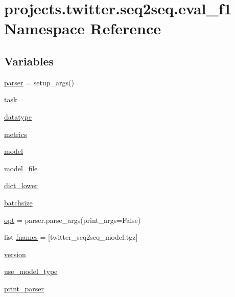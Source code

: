 \hypertarget{namespaceprojects_1_1twitter_1_1seq2seq_1_1eval__f1}{}\section{projects.\+twitter.\+seq2seq.\+eval\+\_\+f1 Namespace Reference}
\label{namespaceprojects_1_1twitter_1_1seq2seq_1_1eval__f1}
\subsection*{Variables}
\begin{DoxyCompactItemize}
\item 
\hyperlink{namespaceprojects_1_1twitter_1_1seq2seq_1_1eval__f1_ad558cbec4682c008ec6e7e47c9f2c86f}{parser} = setup\+\_\+args()
\item 
\hyperlink{namespaceprojects_1_1twitter_1_1seq2seq_1_1eval__f1_a1904a41b81d22bb924ac856a04516a49}{task}
\item 
\hyperlink{namespaceprojects_1_1twitter_1_1seq2seq_1_1eval__f1_abec81d673046392077c8a5664f1be3c1}{datatype}
\item 
\hyperlink{namespaceprojects_1_1twitter_1_1seq2seq_1_1eval__f1_a7ffcfac8a21f48fd5090f37e620fff9a}{metrics}
\item 
\hyperlink{namespaceprojects_1_1twitter_1_1seq2seq_1_1eval__f1_a2208e778d80c4addea6f3813f8ecf512}{model}
\item 
\hyperlink{namespaceprojects_1_1twitter_1_1seq2seq_1_1eval__f1_aa19980951f705066f6262529a5e03402}{model\+\_\+file}
\item 
\hyperlink{namespaceprojects_1_1twitter_1_1seq2seq_1_1eval__f1_a98e83445f8d5caf493455df899e4931d}{dict\+\_\+lower}
\item 
\hyperlink{namespaceprojects_1_1twitter_1_1seq2seq_1_1eval__f1_a227db40ed8ddb1860fafde63b2491bdb}{batchsize}
\item 
\hyperlink{namespaceprojects_1_1twitter_1_1seq2seq_1_1eval__f1_ae2ccb62e5a028bc84095dfcb55b8cfa4}{opt} = parser.\+parse\+\_\+args(print\+\_\+args=False)
\item 
list \hyperlink{namespaceprojects_1_1twitter_1_1seq2seq_1_1eval__f1_abccff798f2afabd844726ed0c65cb71e}{fnames} = \mbox{[}\textquotesingle{}twitter\+\_\+seq2seq\+\_\+model.\+tgz\textquotesingle{}\mbox{]}
\item 
\hyperlink{namespaceprojects_1_1twitter_1_1seq2seq_1_1eval__f1_afd98e55a77b1a26d450a72984100a1f1}{version}
\item 
\hyperlink{namespaceprojects_1_1twitter_1_1seq2seq_1_1eval__f1_aa085d0594e97641873a197556a53448c}{use\+\_\+model\+\_\+type}
\item 
\hyperlink{namespaceprojects_1_1twitter_1_1seq2seq_1_1eval__f1_a43266e8d073c7dd7ead285ec769f1443}{print\+\_\+parser}
\end{DoxyCompactItemize}


